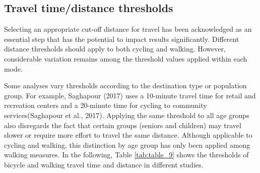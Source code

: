 \documentclass[12pt,twoside]{reedthesis}
\begin{document}
\hypertarget{travel-timedistance-thresholds}{%
\subsection{Travel time/distance thresholds}\label{travel-timedistance-thresholds}}

Selecting an appropriate cut-off distance for travel has been acknowledged as an essential step that has the potential to impact results significantly. Different distance thresholds should apply to both cycling and walking. However, considerable variation remains among the threshold values applied within each mode.

Some analyses vary thresholds according to the destination type or population group. For example, Saghapour (2017) uses a 10-minute travel time for retail and recreation centers and a 20-minute time for cycling to community services(Saghapour et al., 2017). Applying the same threshold to all age groups also disregards the fact that certain groups (seniors and children) may travel slower or require more effort to travel the same distance. Although applicable to cycling and walking, this distinction by age group has only been applied among walking measures. In the following, Table \ref{tab:table_9} shows the thresholds of bicycle and walking travel time and distance in different studies.
\end{document}
